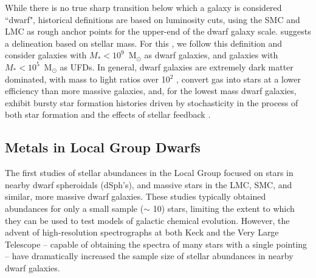 While there is no true sharp transition below which a galaxy is considered ``dwarf", historical definitions are based on luminosity cuts, using the SMC and LMC as rough anchor points for the upper-end of the dwarf galaxy scale. \cite{Bullock2017} suggests a delineation based on stellar mass. For this \Dissertation, we follow this definition and consider galaxies with $M_* < 10^9$~M$_{\odot}$ as dwarf galaxies, and galaxies with $M_* < 10^5$~M$_{\odot}$ as UFDs. In general, dwarf galaxies are extremely dark matter dominated, with mass to light ratios over 10$^2$ \citep{SimonGeha2007,Strigari2008,Wolf2010}, convert gas into stars at a lower efficiency than more massive galaxies,
and, for the lowest mass dwarf galaxies,
exhibit bursty star formation histories driven by stochasticity in the process of both star formation and the effects of stellar feedback
.

\subsection{Metals in Local Group Dwarfs}
\label{intro:sec:metals in LG}

The first studies of stellar abundances in the Local Group focused on stars in nearby dwarf spheroidals (dSph's), and massive stars in the LMC, SMC, and similar, more massive dwarf galaxies. These studies typically obtained abundances for only a small sample ($\sim$ 10) stars, limiting the extent to which they can be used to test models of galactic chemical evolution.  However, the advent of high-resolution spectrographs at both Keck and the Very Large Telescope -- capable of obtaining the spectra of many stars with a single pointing -- have dramatically increased the sample size of stellar abundances in nearby dwarf galaxies.

